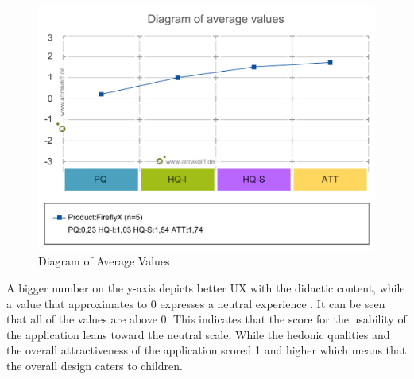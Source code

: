 \begin{figure}[H]
    \centering
    \includegraphics[width=14cm]{figures/NewFigures/Diagram_of_average_values.png}
    \caption{Diagram of Average Values}
    \label{fig:DiagramOfAverageValues}
\end{figure}

A bigger number on the y-axis depicts better UX with the didactic content, while a value that approximates to 0 expresses a neutral experience \cite{giardi2019evaluate}. It can be seen that all of the values are above 0. This indicates that the score for the usability of the application leans toward the neutral scale. While the hedonic qualities and the overall attractiveness of the application scored 1 and higher which means that the overall design caters to children.

